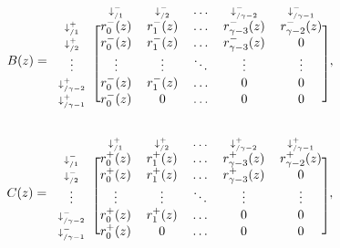 \documentclass{article}
\begin{document}
\begin{equation*}
B(z) = 
\begin{blockarray}{cccccc}
   & \scriptstyle{\downarrow_{/1}^-} & \scriptstyle{\downarrow_{/2}^-} &
   \ldots & \scriptstyle{\downarrow_{/\gamma-2}^-} &
   \scriptstyle{\downarrow_{/\gamma-1}^-} \\
\begin{block}{c[ccccc]}
\scriptstyle{\downarrow_{/1}^+} & r_0^-(z) & r_1^-(z) & \ldots &
    r_{\gamma-3}^-(z) & r_{\gamma-2}^-(z) \\
\scriptstyle{\downarrow_{/2}^+} & r_0^-(z) & r_1^-(z) & \ldots &
    r_{\gamma-3}^-(z) & 0 \\
\vdots & \vdots & \vdots & \ddots & \vdots & \vdots \\
\scriptstyle{\downarrow_{/\gamma-2}^+} & r_0^-(z) & r_1^-(z) &
    \ldots & 0 & 0 \\
\scriptstyle{\downarrow_{/\gamma-1}^+} & r_0^-(z) & 0 & \ldots & 0 & 0 \\
\end{block}
\end{blockarray},
\end{equation*}

\begin{equation*}
C(z) = 
\begin{blockarray}{cccccc}
   & \scriptstyle{\downarrow_{/1}^+} & \scriptstyle{\downarrow_{/2}^+} &
    \ldots & \scriptstyle{\downarrow_{/\gamma-2}^+} &
    \scriptstyle{\downarrow_{/\gamma-1}^+} \\
\begin{block}{c[ccccc]}
\scriptstyle{\downarrow_{/1}^-} & r_0^+(z) & r_1^+(z) & \ldots &
    r_{\gamma-3}^+(z) & r_{\gamma-2}^+(z) \\
\scriptstyle{\downarrow_{/2}^-} & r_0^+(z) & r_1^+(z) & \ldots &
    r_{\gamma-3}^+(z) & 0 \\
\vdots & \vdots & \vdots & \ddots & \vdots & \vdots \\
\scriptstyle{\downarrow_{/\gamma-2}^-} & r_0^+(z) & r_1^+(z) & \ldots &
    0 & 0 \\
\scriptstyle{\downarrow_{/\gamma-1}^-} & r_0^+(z) & 0 & \ldots & 0 & 0 \\
\end{block}
\end{blockarray},
\end{equation*}
\end{document}

